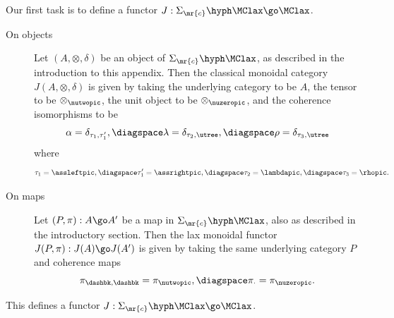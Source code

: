 Our first task is to define a functor $J: \Sigma_\mr{c}\hyph\MClax \go
\MClax$.

\begin{description}
\item[On objects] Let $(A, \otimes, \delta)$ be an object of
$\Sigma_\mr{c}\hyph\MClax$, as described in the introduction to this
appendix.  Then the classical monoidal category $J(A, \otimes, \delta)$ is
given by taking the underlying category to be $A$, the tensor to be
$\otimes_\nutwopic$, the unit object to be $\otimes_\nuzeropic$, and
the coherence isomorphisms to be
\[
\alpha = \delta_{\tau_1, \tau'_1},
\diagspace
\lambda = \delta_{\tau_2, \utree},
\diagspace
\rho = \delta_{\tau_3, \utree}
\]
where
\[
\tau_1 = \assleftpic,
\diagspace
\tau'_1 = \assrightpic,
\diagspace
\tau_2 = \lambdapic,
\diagspace
\tau_3 = \rhopic.
\]
%
\item[On maps] Let $(P, \pi): A \go A'$ be a map in
$\Sigma_\mr{c}\hyph\MClax$, also as described in the introductory section.
Then the lax monoidal functor $J(P,\pi): J(A) \go J(A')$ is given by taking
the same underlying category $P$ and coherence maps
\[
\pi_{\dashbk, \dashbk} = \pi_{\nutwopic},
\diagspace
\pi_\cdot = \pi_{\nuzeropic}.
\] 
\end{description}

\begin{lemma}
This defines a functor $J: \Sigma_\mr{c}\hyph\MClax \go \MClax$.
\end{lemma}

